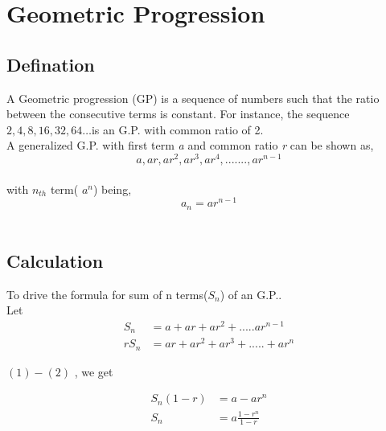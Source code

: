 \documentclass[a4paper,10pt]{article}
\begin{document}

\section{Geometric Progression}
\subsection*{Defination}
A Geometric progression (GP) is a sequence of numbers such that the ratio between the consecutive terms is constant. 
For instance, the sequence $2, 4, 8, 16, 32, 64 … $is an G.P. with common ratio of 2.\\
A generalized G.P. with first term \emph{a} and common ratio \emph{r} can be shown as,
$$a , ar ,  ar^2 ,  ar^3 ,  ar^4 , ....... , ar^{n-1}$$\\
with $n_{th}$ term( $a^n$) being,
$$a_n = ar^{n-1}$$\\

\subsection*{Calculation}
To drive the formula for sum of n terms($S_n$) of an G.P..\\
Let \\
\begin{align}
S_n&= a + ar + ar^2 + ..... ar^{n-1} \\
rS_n&=ar + ar^2 + ar^3 + ..... + ar^n 
\end{align}

$(1) - (2)$ , we get

\begin{align*}
S_n (1 - r) & = a - ar^n\\
S_n & = a \frac{1 - r^n}{1 - r}
\end{align*}
\end{document}
